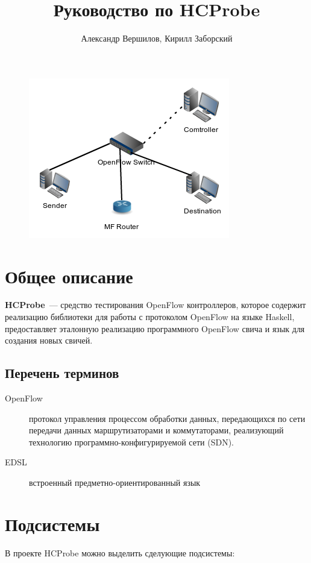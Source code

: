 \documentclass[9pt,a4paper]{article}
\title{Руководство по HCProbe}
\author{Александр Вершилов, Кирилл Заборский}
\begin{document}
\maketitle
\begin{figure}[!h]
   \centering 
   \includegraphics[width=0.3\columnwidth]{images/testcfg2.png}
\end{figure}                                                        

\tableofcontents

\pagebreak

\section{Общее описание}

\textbf{HCProbe}~--- средство тестирования OpenFlow контроллеров, которое содержит реализацию библиотеки для работы с протоколом
OpenFlow на языке Haskell, предоставляет эталонную реализацию программного OpenFlow свича и язык для создания новых свичей.

\subsection{Перечень терминов}

\begin{description}
  \item[OpenFlow] протокол управления процессом обработки данных, передающихся
    по сети передачи данных маршрутизаторами и коммутаторами, реализующий
    технологию программно-конфигурируемой сети (SDN).
  \item[EDSL] встроенный предметно-ориентированный язык
\end{description}

\pagebreak

\section{Подсистемы}

В проекте HCProbe можно выделить сделующие подсистемы:
\end{document}
